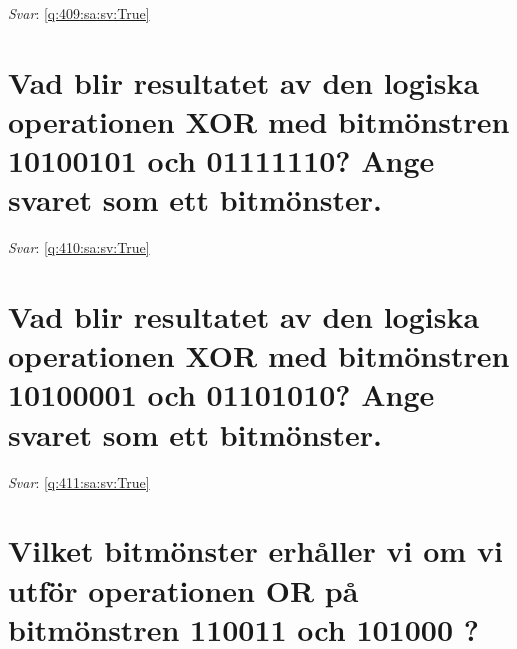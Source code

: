 \documentclass[a4paper,11pt,oneside]{book}
\begin{document}
\begin{sloppypar}
\label{q:409:sa:sv:False}

\vspace{2cm}

\noindent\makebox[\textwidth]{\hrulefill}

\vspace{1cm}

\textit{Svar}: \autoref{q:409:sa:sv:True}



\section{Vad blir resultatet av den logiska operationen XOR med bitm\"onstren 10100101 och 01111110? Ange svaret som ett bitm\"onster.}

\label{q:410:sa:sv:False}

\vspace{2cm}

\noindent\makebox[\textwidth]{\hrulefill}

\vspace{1cm}

\textit{Svar}: \autoref{q:410:sa:sv:True}



\section{Vad blir resultatet av den logiska operationen XOR med bitm\"onstren 10100001 och 01101010? Ange svaret som ett bitm\"onster.}

\label{q:411:sa:sv:False}

\vspace{2cm}

\noindent\makebox[\textwidth]{\hrulefill}

\vspace{1cm}

\textit{Svar}: \autoref{q:411:sa:sv:True}



\section{Vilket bitm\"onster erh\r{a}ller vi om vi utf\"or operationen OR p\r{a} bitm\"onstren 110011 och 101000 ?}

\label{q:412:sa:sv:False}

\vspace{2cm}

\noindent\makebox[\textwidth]{\hrulefill}


\end{sloppypar}
\end{document}
